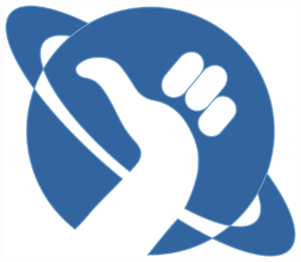 \lipsum[3-4]

\begin{figure}[h]
\includegraphics[width=\textwidth]{do-not-panic-logo.png}
\centering
\end{figure}

\newpage


